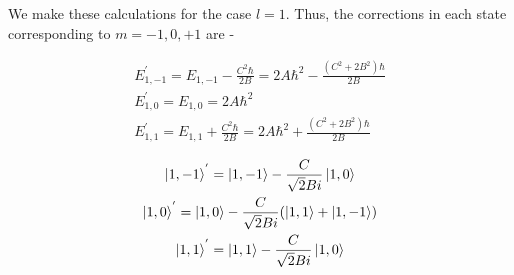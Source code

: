     We make these calculations for the case $l = 1$. Thus, the corrections in each state corresponding to $m = -1, 0, +1$ are -

    \begin{gather*}
        E^{'}_{1,-1} = E_{1,-1} - \frac{C^2\hbar}{2B} = 2A\hbar^2 - \frac{(C^2 + 2B^2)\hbar}{2B}\\
        E^{'}_{1,0} = E_{1,0} = 2A\hbar^2\\
        E^{'}_{1,1} = E_{1,1} + \frac{C^2\hbar}{2B} = 2A\hbar^2 + \frac{(C^2 + 2B^2)\hbar}{2B}
    \end{gather*}

    \begin{gather*}
        \ket{1,-1}^{'} = \ket{1,-1} - \frac{C}{\sqrt{2}Bi}\ket{1,0} \\
        \ket{1,0}^{'} = \ket{1,0} - \frac{C}{\sqrt{2}Bi}(\ket{1,1} + \ket{1,-1})\\
        \ket{1,1}^{'} = \ket{1,1} - \frac{C}{\sqrt{2}Bi}\ket{1,0} 
    \end{gather*}
